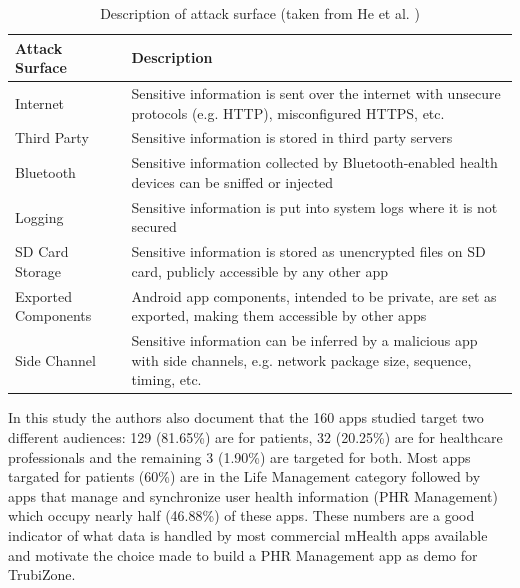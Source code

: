 \begin{table}[t]
	\caption {Description of attack surface (taken from He et al. \cite{he2014security})}
	\label{tab:attacksurfaces}
	\begin{tabular}{|>{\raggedright}p{2cm}|>{\raggedright\arraybackslash}p{10cm}|}
		\hline
		\textbf{Attack Surface}      & \textbf{Description}                                                                                                                    \\ \hline
		Internet            & Sensitive information is sent over the internet with unsecure protocols (e.g. HTTP), misconfigured HTTPS, etc.                 \\ \hline
		Third Party         & Sensitive information is stored in third party servers                                                                         \\ \hline
		Bluetooth           & Sensitive information collected by Bluetooth-enabled health devices can be sniffed or injected                                 \\ \hline
		Logging             & Sensitive information is put into system logs where it is not secured                                                          \\ \hline
		SD Card Storage     & Sensitive information is stored as unencrypted files on SD card, publicly accessible by any other app                          \\ \hline
		Exported Components &  Android app components, intended to be private, are set as exported, making them accessible by other apps                     \\ \hline
		Side Channel        & Sensitive information can be inferred by a malicious app with side channels, e.g. network package size, sequence, timing, etc. \\ \hline
	\end{tabular}
\end{table}

In this study the authors also document that the 160 apps studied target two different audiences: 129 (81.65\%) are for patients, 32 (20.25\%) are for healthcare professionals and the remaining 3 (1.90\%) are targeted for both. Most apps targated for patients (60\%) are in the Life Management category followed by apps that manage and synchronize user health information (\ac{PHR} Management) which occupy nearly half (46.88\%) of these apps. These numbers are a good indicator of what data is handled by most commercial mHealth apps available and motivate the choice made to build a \ac{PHR} Management app as demo for TrubiZone.

